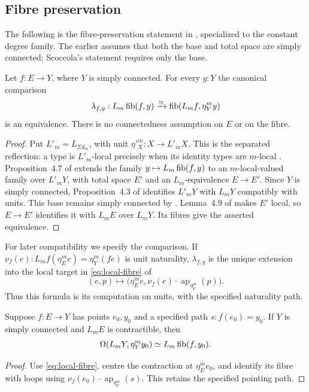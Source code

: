 \subsection{Fibre preservation}\label{sec:fibres}
The following is the fibre-preservation statement in \cite[\S4, observation following Proposition~4.10]{scoccola}, specialized to the constant degree family. The earlier \cite[Lemma~4.16]{cors} assumes that both the base and total space are simply connected; Scoccola's statement requires only the base.
\begin{theorem}\label{thm:local-fibre}
Let $f:E\to Y$, where $Y$ is simply connected. For every $y:Y$ the canonical comparison
\begin{equation}\label{eq:local-fibre}
\lambda_{f,y}:L_m\operatorname{fib}(f,y)\xrightarrow{\simeq}\operatorname{fib}(L_mf,\eta^m_Yy)
\end{equation}
is an equivalence. There is no connectedness assumption on $E$ or on the fibre.
\end{theorem}
\begin{proof}
Put $L'_m=L_{\Sigma d_m}$, with unit $\eta'^m_X:X\to L'_mX$. This is the separated reflection: a type is $L'_m$-local precisely when its identity types are $m$-local \cite[Lemma~2.15]{cors}. Proposition~4.7 of \cite{scoccola} extends the family $y\mapsto L_m\operatorname{fib}(f,y)$ to an $m$-local-valued family over $L'_mY$, with total space $E'$ and an $L_m$-equivalence $E\to E'$. Since $Y$ is simply connected, Proposition~4.3 of \cite{scoccola} identifies $L'_mY$ with $L_mY$ compatibly with units. This base remains simply connected by \cite[Corollary~4.14]{cors}. Lemma~4.9 of \cite{scoccola} makes $E'$ local, so $E\to E'$ identifies it with $L_mE$ over $L_mY$. Its fibres give the asserted equivalence.
\end{proof}
For later compatibility we specify the comparison. If $\nu_f(e):L_mf(\eta^m_Ee)=\eta^m_Y(fe)$ is unit naturality, $\lambda_{f,y}$ is the unique extension into the local target in \eqref{eq:local-fibre} of
\[
(e,p)\longmapsto\bigl(\eta^m_Ee,\nu_f(e)\cdot\operatorname{ap}_{\eta^m_Y}(p)\bigr).
\]
Thus this formula is its computation on units, with the specified naturality path.

\begin{corollary}\label{cor:local-machine}
Suppose $f:E\to Y$ has points $e_0,y_0$ and a specified path $s:f(e_0)=y_0$. If $Y$ is simply connected and $L_mE$ is contractible, then
\[
\Omega(L_mY,\eta^m_Yy_0)\simeq L_m\operatorname{fib}(f,y_0).
\]
\end{corollary}
\begin{proof}
Use \eqref{eq:local-fibre}, centre the contraction at $\eta^m_Ee_0$, and identify its fibre with loops using $\nu_f(e_0)\cdot\operatorname{ap}_{\eta^m_Y}(s)$. This retains the specified pointing path.
\end{proof}

